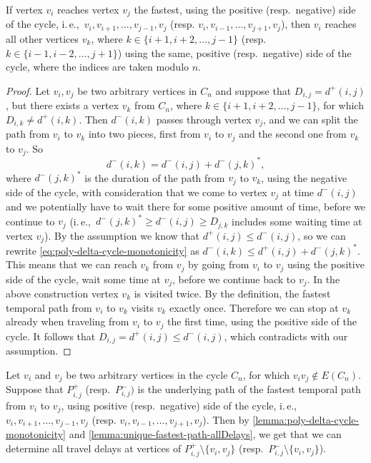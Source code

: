 \documentclass[a4paper,UKenglish,cleveref, autoref, thm-restate, anonymous]{lipics-v2021}
\newcommand{\ie}{i.\,e.,\ }
\begin{document}
\begin{lemma} \label{lemma:poly-delta-cycle-monotonicity}
    If vertex $v_i$ reaches vertex $v_j$ the fastest, using the positive (resp.~negative) side of the cycle, \ie $v_i, v_{i+1}, \dots, v_{j-1}, v_j$ (resp. $v_i, v_{i-1}, \dots, v_{j+1}, v_j$),
    then $v_i$ reaches all other vertices $v_k$, where $k \in \{i+1, i+2, \dots, j-1\}$ (resp.~ $k \in \{i-1, i-2, \dots, j+1\}$)
    using the same, positive (resp.~negative) side of the cycle,
    where the indices are taken modulo $n$.
\end{lemma}
\begin{proof}
    Let $v_i, v_j$ be two arbitrary vertices in $C_n$ and suppose that $D_{i,j} = d^+(i,j)$,
    but there exists a vertex $v_k$ from $C_n$, where $k \in \{i+1, i+2, \dots, j-1\}$,
    for which $D_{i,k} \neq d^+(i,k)$.
    Then $d^-(i,k)$ passes through vertex $v_j$, and we can split the path from $v_i$ to $v_k$ into two pieces, 
    first from $v_i$ to $v_j$ and the second one from $v_k$ to $v_j$.
    So 
    \begin{equation} \label{eq:poly-delta-cycle-monotonicity}
        d^-(i,k) = d^-(i,j) + d^-(j,k)^*,
    \end{equation} where $d^-(j,k)^*$ is the duration of the path from $v_j$ to $v_k$, using the negative side of the cycle, with consideration that we come to vertex $v_j$ at time $d^-(i,j)$ and we potentially have to wait there for some positive amount of time, before we continue to $v_j$
    (\ie $d^-(j,k)^* \geq d^-(i,j) \geq D_{j,k}$ includes some waiting time at vertex $v_j$).
    By the assumption we know that $d^+(i,j) \leq d^-(i,j)$, so we can rewrite \cref{eq:poly-delta-cycle-monotonicity} as
    $d^-(i,k) \leq d^+(i,j) + d^-(j,k)^*$. This means that we can reach $v_k$ from $v_j$ by going from $v_i$ to $v_j$ using the positive side of the cycle, wait some time at $v_j$, before we continue back to $v_j$.
    In the above construction vertex $v_k$ is visited twice. By the definition, the fastest temporal path from $v_i$ to $v_k$ visits $v_k$ exactly once. Therefore we can stop at $v_k$ already when traveling from $v_i$ to $v_j$ the first time, using the positive side of the cycle.
    It follows that $D_{i,j} = d^+(i,j) \leq d^-(i,j)$, which contradicts with our assumption.
\end{proof}

Let $v_i$ and $v_j$ be two arbitrary vertices in the cycle $C_n$, for which $v_i v_j \notin E(C_n)$.
Suppose that $P^+_{i,j}$ (resp.~$P^-_{i,j})$ is the underlying path of the fastest temporal path from $v_i$ to $v_j$, 
using positive (resp.~negative) side of the cycle, 
\ie $v_i, v_{i+1}, \dots, v_{j-1}, v_j$ (resp. $v_i, v_{i-1}, \dots, v_{j+1}, v_j$).
Then by \cref{lemma:poly-delta-cycle-monotonicity} and \cref{lemma:unique-fastest-path-allDelays},
we get that we can determine all travel delays at vertices of $P^+_{i,j} \setminus \{v_i, v_j\}$ (resp.~$P^-_{i,j} \setminus \{v_i, v_j\}$).
\end{document}

